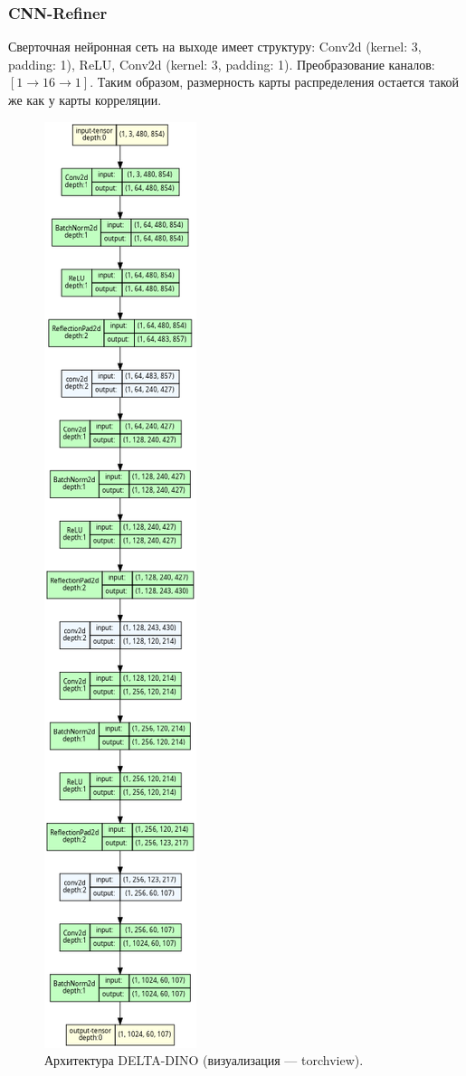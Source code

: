 \documentclass[a4paper, 14pt]{extarticle}
\theoremstyle{definition}
\theoremstyle{plain}
\theoremstyle{remark}
\begin{document}
\subsubsection{CNN-Refiner}
Сверточная нейронная сеть на выходе имеет структуру: Conv2d (kernel: 3, padding: 1), ReLU, Conv2d (kernel: 3, padding: 1). Преобразование каналов: $[1 \to 16 \to 1]$. Таким образом, размерность карты распределения остается такой же как у карты корреляции.

\begin{figure}
    [H]
    \centering
    \includegraphics[height=0.95\textheight]{figs/Delta-DINO.gv.png}
    \caption{Архитектура DELTA-DINO (визуализация --- torchview).}
    \label{fig:delta-dino}
\end{figure}
\end{document}
